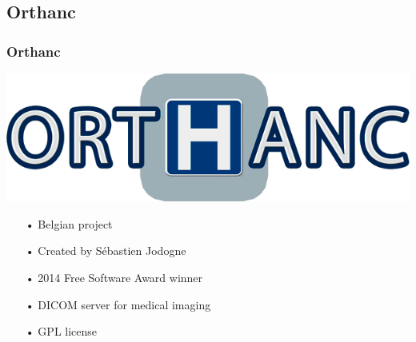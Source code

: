 \documentclass[11pt]{beamer}
\begin{document}
\subsection{Orthanc}

\begin{frame}
\frametitle{Orthanc}
\includegraphics[scale=0.15]{Orthanc.png}
\begin{itemize}[<+->]
\item[•] Belgian project
\item[•] Created by Sébastien Jodogne
\item[•] 2014 Free Software Award winner
\item[•] DICOM server for medical imaging
\item[•] GPL license
\end{itemize}
\end{frame}

%
\end{document}

